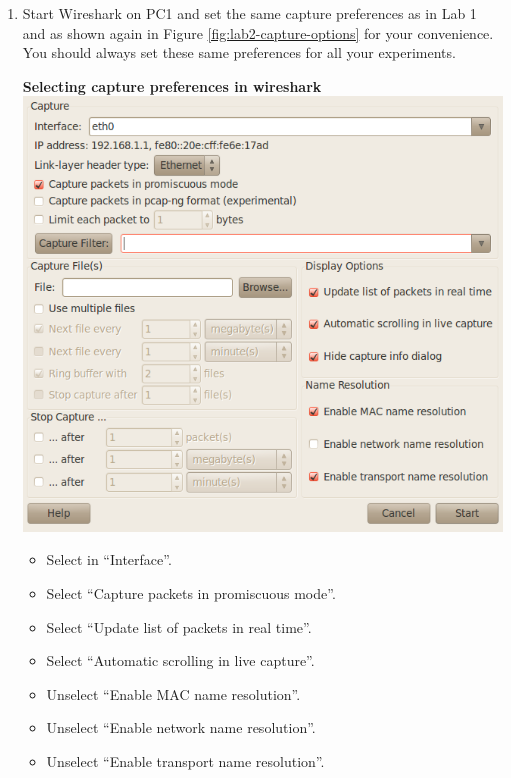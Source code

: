 \begin{enumerate}
	\item Start Wireshark on PC1 and set the same capture preferences as in Lab 1 and as shown again in Figure \ref{fig:lab2-capture-options} for your convenience. You should always set these same preferences for all your experiments.\par
		\begin{minipage}{\linewidth}
			\begin{framed}
				\centering
				\textbf{Selecting capture preferences in wireshark} \\
				\includegraphics[width=\linewidth]{graphics/capture-options-updated.png}
				\begin{itemize}
					\item Select  in ``Interface''.
					\item Select ``Capture packets in promiscuous mode''.
					\item Select ``Update list of packets in real time''.
					\item Select ``Automatic scrolling in live capture''.
					\item Unselect ``Enable MAC name resolution''.
					\item Unselect ``Enable network name resolution''.
					\item Unselect ``Enable transport name resolution''.
				\end{itemize}
			\end{framed}

\end{minipage}
\end{enumerate}

